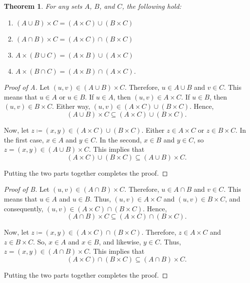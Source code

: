 \documentclass[headings=standardclasses]{scrartcl}
\newtheorem{theorem}{Theorem}
\theoremstyle{definition}
\begin{document}
\begin{theorem}
  For any sets \(A\), \(B\), and \(C\), the following hold:
  \begin{enumerate}[label=(\alph*)]
    \item \((A ∪ B) × C = (A × C) ∪ (B × C)\)
    \item \((A ∩ B) × C = (A × C) ∩ (B × C)\)
    \item \(A × (B ∪ C) = (A × B) ∪ (A × C)\)
    \item \(A × (B ∩ C) = (A × B) ∩ (A × C)\).
  \end{enumerate}
\end{theorem}

\begin{proof}[Proof of A]
  Let \((u, v) ∈ (A ∪ B) × C\). Therefore, \(u ∈ A ∪ B\) and \(v ∈ C\). This
  means that \(u ∈ A\) or \(u ∈ B\). If \(u ∈ A\), then \((u, v) ∈ A × C\). If
  \(u ∈ B\), then \((u, v) ∈ B × C\). Either way, \((u, v) ∈ (A × C) ∪ (B ×
  C)\). Hence,
  \begin{equation*}
    (A ∪ B) × C ⊆ (A × C) ∪ (B × C).
  \end{equation*}

  Now, let \(z ≔ (x, y) ∈ (A × C) ∪ (B × C)\). Either \(z ∈ A × C\) or \(z ∈ B
  × C\). In the first case, \(x ∈ A\) and \(y ∈ C\). In the second, \(x ∈ B\)
  and \(y ∈ C\), so \(z = (x, y) ∈ (A ∪ B) × C\). This implies that
  \begin{equation*}
    (A × C) ∪ (B × C) ⊆ (A ∪ B) × C.
  \end{equation*}

  Putting the two parts together completes the proof.
\end{proof}

\begin{proof}[Proof of B]
  Let \((u, v) ∈ (A ∩ B) × C\). Therefore, \(u ∈ A ∩ B\) and \(v ∈ C\). This
  means that \(u ∈ A\) and \(u ∈ B\). Thus, \((u, v) ∈ A × C\) and \((u, v) ∈ B
  × C\), and consequently, \((u, v) ∈ (A × C) ∩ (B × C)\). Hence,
  \begin{equation*}
    (A ∩ B) × C ⊆ (A × C) ∩ (B × C).
  \end{equation*}

  Now, let \(z ≔ (x, y) ∈ (A × C) ∩ (B × C)\).  Therefore, \(z ∈ A × C\) and
  \(z ∈ B × C\). So, \(x ∈ A\) and \(x ∈ B\), and likewise, \(y ∈ C\). Thus,
  \(z = (x, y) ∈ (A ∩ B) × C\). This implies that
  \begin{equation*}
       (A × C) ∩ (B × C) ⊆ (A ∩ B) × C.
  \end{equation*}

  Putting the two parts together completes the proof.
\end{proof}
\end{document}
